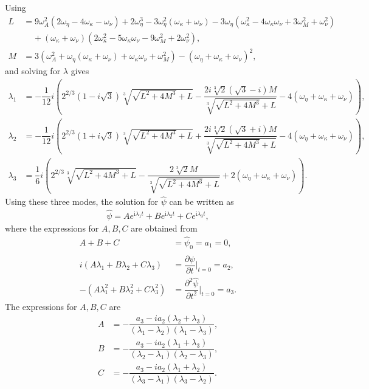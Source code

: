 \documentclass[12pt,psfig]{article}
\begin{document}
Using
\begin{align*}
L&=9 \omega_A^2 (2 \omega_\eta-4 \omega_\kappa-\omega_\nu)+2 \omega_\eta^3-3 \omega_\eta^2 (\omega_\kappa+\omega_\nu)-3 \omega_\eta \left(\omega_\kappa^2-4 \omega_\kappa \omega_\nu+3 \omega_M^2+\omega_\nu^2\right)\\
&\mspace{20mu}+(\omega_\kappa+\omega_\nu) \left(2 \omega_\kappa^2-5 \omega_\kappa \omega_\nu-9 \omega_M^2+2 \omega_\nu^2\right),\\
M&=3 \left(\omega_A^2+\omega_\eta (\omega_\kappa+\omega_\nu)+\omega_\kappa \omega_\nu+\omega_M^2\right)-(\omega_\eta+\omega_\kappa+\omega_\nu)^2,
\end{align*}
and solving for $\lambda$ gives
\begin{align*}
\lambda_1&=-\dfrac{1}{12} i \left(2^{2/3} \left(1-i \sqrt{3}\right) \sqrt[3]{\sqrt{L^2+4 M^3}+L}-\dfrac{2 i \sqrt[3]{2} \left(\sqrt{3}-i\right) M}{\sqrt[3]{\sqrt{L^2+4 M^3}+L}}-4 (\omega_\eta+\omega_\kappa+\omega_\nu)\right),\\
\lambda_2&=-\dfrac{1}{12} i \left(2^{2/3} \left(1+i \sqrt{3}\right) \sqrt[3]{\sqrt{L^2+4 M^3}+L}+\dfrac{2 i \sqrt[3]{2} \left(\sqrt{3}+i\right) M}{\sqrt[3]{\sqrt{L^2+4 M^3}+L}}-4 (\omega_\eta+\omega_\kappa+\omega_\nu)\right),\\
\lambda_3&=\dfrac{1}{6} i \left(2^{2/3} \sqrt[3]{\sqrt{L^2+4 M^3}+L}-\dfrac{2 \sqrt[3]{2} M}{\sqrt[3]{\sqrt{L^2+4 M^3}+L}}+2 (\omega_\eta+\omega_\kappa+\omega_\nu)\right).
\end{align*}
Using these three modes, the solution for $\hat{\psi}$ can be written as
\begin{align*}
\hat{\psi}=Ae^{\mathrm{i}\lambda_1t}+Be^{\mathrm{i}\lambda_2t}+Ce^{\mathrm{i}\lambda_3t},
\end{align*}
where the expressions for $A,B,C$ are obtained from
\begin{align*}
A+B+C&=\hat{\psi}_0=a_1=0,\\
i(A\lambda_1+B\lambda_2+C\lambda_3)&=\dfrac{\partial \hat{\psi}}{\partial t}\bigg|_{t=0}=a_2,\\
-(A\lambda_1^2+B\lambda_2^2+C\lambda_3^2)&=\dfrac{\partial^2 \hat{\psi}}{\partial t^2}\bigg|_{t=0}=a_3.
\end{align*}
The expressions for $A,B,C$ are
\begin{align*}
A&=-\dfrac{a_3-i a_2 (\lambda_2+ \lambda_3)}{(\lambda_1-\lambda_2) (\lambda_1-\lambda_3)},\\
B&=-\dfrac{a_3-i a_2 (\lambda_1+ \lambda_3)}{(\lambda_2-\lambda_1) (\lambda_2-\lambda_3)},\\
C&=-\dfrac{a_3-i a_2 (\lambda_1+ \lambda_2)}{(\lambda_3-\lambda_1) (\lambda_3-\lambda_2)}.
\end{align*}
\end{document}
